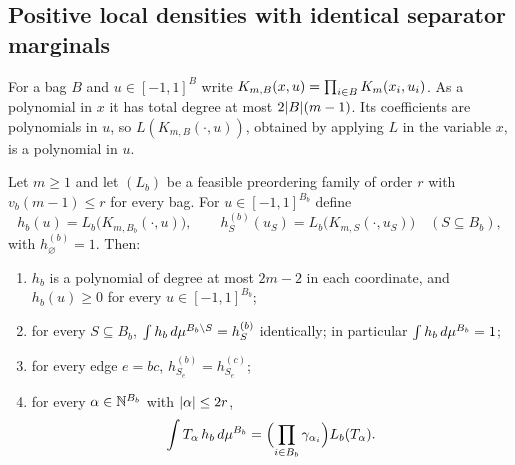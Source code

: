 \subsection{Positive local densities with identical separator marginals}
\label{sec:ker-densities}

For a bag $B$ and $u\in[-1,1]^B$ write
$K_{m,B}(x,u)=\prod_{i\in B}K_m(x_i,u_i)$. As a polynomial in $x$ it has
total degree at most $2\lvert B\rvert(m-1)$. Its coefficients are polynomials in
$u$, so $L(K_{m,B}(\cdot,u))$, obtained by applying $L$ in the variable $x$,
is a polynomial in $u$.

\begin{lemma}\label{lem:pre-density}
Let $m\ge1$ and let $(L_b)$ be a feasible preordering family of order $r$
with $v_b(m-1)\le r$ for every bag. For $u\in[-1,1]^{B_b}$ define
\begin{equation}\label{eq:ker-density}
  h_b(u)=L_b\bigl(K_{m,B_b}(\cdot,u)\bigr),\qquad
  h^{(b)}_S(u_S)=L_b\bigl(K_{m,S}(\cdot,u_S)\bigr)\quad(S\subseteq B_b),
\end{equation}
with $h^{(b)}_\varnothing=1$. Then:
\begin{enumerate}[label=(\alph*)]
\item $h_b$ is a polynomial of degree at most $2m-2$ in each coordinate,
  and $h_b(u)\ge0$ for every $u\in[-1,1]^{B_b}$;
\item for every $S\subseteq B_b$,
  $\int h_b\,d\mu^{B_b\setminus S}=h^{(b)}_S$ identically; in particular
  $\int h_b\,d\mu^{B_b}=1$;
\item for every edge $e=bc$, $h^{(b)}_{S_e}=h^{(c)}_{S_e}$;
\item for every $\alpha\in\mathbb{N}^{B_b}$ with $\lvert \alpha\rvert\le2r$,
  \begin{equation}\label{eq:ker-moment-smoothing}
    \int T_\alpha\,h_b\,d\mu^{B_b}
    =\Bigl(\prod_{i\in B_b}\gamma_{\alpha_i}\Bigr)L_b(T_\alpha).
  \end{equation}
\end{enumerate}
\end{lemma}

